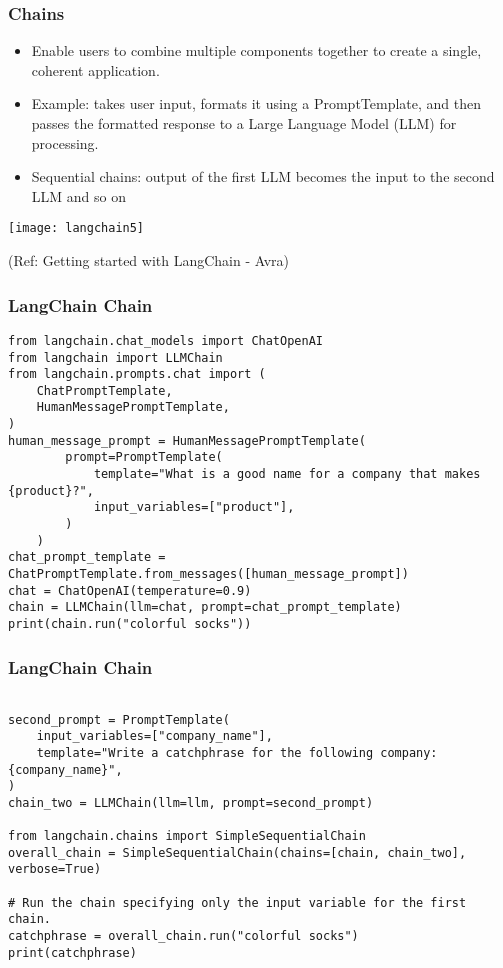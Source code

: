 \begin{frame}\frametitle{Chains}

\begin{itemize}
\item Enable users to combine multiple components together to create a single, coherent application.
\item Example: takes user input, formats it using a PromptTemplate, and then passes the formatted response to a Large Language Model (LLM) for processing.
\item Sequential chains: output of the first LLM becomes the input to the second LLM and so on
\end{itemize}

\begin{center}
\texttt{[image: langchain5]}
\end{center}	  


{\tiny (Ref: Getting started with LangChain - Avra)}
\end{frame}

\begin{frame}[fragile]\frametitle{LangChain Chain}


\begin{lstlisting}
from langchain.chat_models import ChatOpenAI
from langchain import LLMChain
from langchain.prompts.chat import (
    ChatPromptTemplate,
    HumanMessagePromptTemplate,
)
human_message_prompt = HumanMessagePromptTemplate(
        prompt=PromptTemplate(
            template="What is a good name for a company that makes {product}?",
            input_variables=["product"],
        )
    )
chat_prompt_template = ChatPromptTemplate.from_messages([human_message_prompt])
chat = ChatOpenAI(temperature=0.9)
chain = LLMChain(llm=chat, prompt=chat_prompt_template)
print(chain.run("colorful socks"))

\end{lstlisting}	  

\end{frame}


\begin{frame}[fragile]\frametitle{LangChain Chain}


\begin{lstlisting}

second_prompt = PromptTemplate(
    input_variables=["company_name"],
    template="Write a catchphrase for the following company: {company_name}",
)
chain_two = LLMChain(llm=llm, prompt=second_prompt)

from langchain.chains import SimpleSequentialChain
overall_chain = SimpleSequentialChain(chains=[chain, chain_two], verbose=True)

# Run the chain specifying only the input variable for the first chain.
catchphrase = overall_chain.run("colorful socks")
print(catchphrase)
\end{lstlisting}	  

\end{frame}

